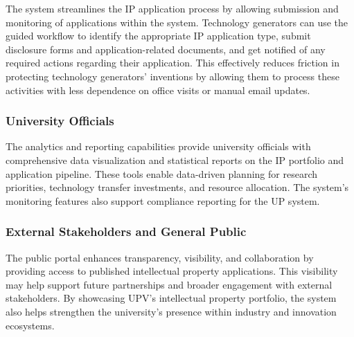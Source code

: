 The system streamlines the IP application process by allowing submission and monitoring of applications within the system. 
Technology generators can use the guided workflow to identify the appropriate IP application type, submit disclosure forms and application-related documents, and get notified of any required actions regarding their application. 
This effectively reduces friction in protecting technology generators’ inventions by allowing them to process these activities with less dependence on office visits or manual email updates.

\subsubsection*{University Officials}

The analytics and reporting capabilities provide university officials with comprehensive data visualization and statistical reports on the IP portfolio and application pipeline. These tools enable data-driven planning for research priorities, technology transfer investments, and resource allocation. The system's monitoring features also support compliance reporting for the UP system.

\subsubsection*{External Stakeholders and General Public}

The public portal enhances transparency, visibility, and collaboration by providing access to published intellectual property applications. This visibility may help support future partnerships and broader engagement with external stakeholders. By showcasing UPV's intellectual property portfolio, the system also helps strengthen the university's presence within industry and innovation ecosystems.
